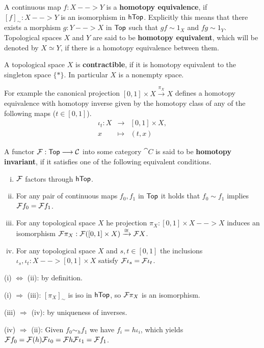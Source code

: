 	\begin{definition}
		A continuous map $f:X-->Y$ is a \textbf{homotopy equivalence}, if $[f]_\sim: X --> Y$ is an isomorphism in $\textsf{hTop}$. Explicitly this means that there exists a morphism $g:Y --> X$ in $\textsf{Top}$ such that $gf \sim 1_X$ and $fg \sim 1_Y$. Topological spaces $X$ and $Y$ are said to be \textbf{homotopy equivalent}, which will be denoted by $X \simeq Y$, if there is a homotopy equivalence between them.

		A topological space $X$ is \textbf{contractible}, if it is homotopy equivalent to the singleton space $\{*\}$. In particular $X$ is a nonempty space.
	\end{definition}

	For example the canonical projection $[0,1] \times X \xrightarrow{\pi_X} X$ defines a homotopy equivalence with homotopy inverse given by the homotopy class of any of the following maps ($t \in [0,1]$).
	\begin{equation*}
		\begin{array}{rcc}
			\iota_t:X &\longrightarrow &[0,1] \times X,\\
			 x & \longmapsto &(t,x)
		\end{array}
	\end{equation*}

	\begin{definition}
		A functor $\mathcal{F}:\textsf{Top} --> \mathcal{C}$ into some category $\cat{C}$ is said to be \textbf{homotopy invariant}, if it satisfies one of the following equivalent conditions.
		\begin{enumerate}[(i)]
			\item{
				$\mathcal{F}$ factors through $\textsf{hTop}$.
			}
			\item{
				For any pair of continuous maps $f_0,f_1$ in $\textsf{Top}$ it holds that $f_0 \sim f_1$ implies $\mathcal{F}f_0 = \mathcal{F}f_1$.
			}
			\item{
				For any topological space $X$ he projection $\pi_X:[0,1]\times X --> X$ induces an isomorphism $\mathcal{F}\pi_X: \mathcal{F}([0,1]\times X) \xrightarrow{\cong} \mathcal{F}X$.
			}
			\item{
				For any topological space $X$ and $s,t \in [0,1]$ the inclusions $\iota_s, \iota_t: X --> [0,1]\times X$ satisfy $\mathcal{F}\iota_s = \mathcal{F}\iota_t$.
			}
		\end{enumerate}
	\end{definition}
	\begin{sketch}
		(i) $\Leftrightarrow$ (ii): by definition.

		(i) $\Rightarrow$ (iii):  $[\pi_X]_\sim$ is iso in $\textsf{hTop}$, so $\mathcal{F}\pi_X$ is an isomorphism.

		(iii) $\Rightarrow$ (iv): by uniqueness of inverses.

		(iv) $\Rightarrow$ (ii): Given $f_0 \sim_h f_1$ we have $f_i = h\iota_i$, which yields $\mathcal{F}f_0 = \mathcal{F}(h)\mathcal{F}\iota_0 = \mathcal{F}h\mathcal{F}\iota_1 = \mathcal{F}f_1$.

	\end{sketch}

